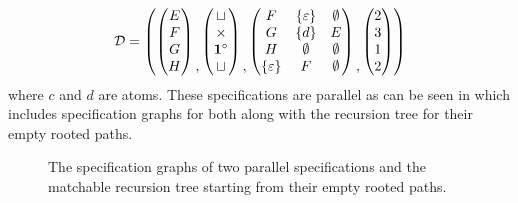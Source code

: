 \[
    \mathcal{D} = \left(
        \begin{pmatrix}
            E\\F\\G\\H
        \end{pmatrix}
        \begin{matrix}\\\\\\,\end{matrix}
        \begin{pmatrix}
            \sqcup\\\times\\\mathbf{1}^\circ\\\sqcup
        \end{pmatrix}
        \begin{matrix}\\\\\\,\end{matrix}
        \begin{pmatrix}
            F & \left\{\varepsilon\right\} & \emptyset\\
            G & \left\{d\right\} & E\\
            H & \emptyset & \emptyset\\
            \left\{\varepsilon\right\} & F & \emptyset
        \end{pmatrix}
        \begin{matrix}\\\\\\,\end{matrix}
        \begin{pmatrix}
            2\\3\\1\\2
        \end{pmatrix}
    \right)
\]
where $c$ and $d$ are atoms. These specifications are parallel as can be seen in  which includes specification graphs for both along with the recursion tree for their empty rooted paths.
\begin{figure}[ht!]
    \centering
    
    \vspace{0.7cm}
    
    \caption{The specification graphs of two parallel specifications and the matchable recursion tree starting from their empty rooted paths.}
    \label{fig:para_spec}
\end{figure}


